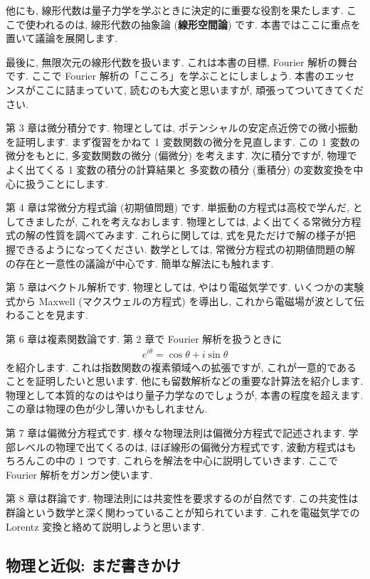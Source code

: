 \documentclass[openany, a4paper, oneside]{jsbook}
\theoremstyle{break}
\theoremstyle{breakdefn}
\begin{document}
他にも, 線形代数は量子力学を学ぶときに決定的に重要な役割を果たします.
ここで使われるのは, 線形代数の抽象論 (\textbf{線形空間論}) です.
本書ではここに重点を置いて議論を展開します.

最後に, 無限次元の線形代数を扱います.
これは本書の目標, Fourier 解析の舞台です.
ここで Fourier 解析の「こころ」を学ぶことにしましょう.
本書のエッセンスがここに詰まっていて, 読むのも大変と思いますが,
頑張ってついてきてください.

第 3 章は微分積分です.
物理としては, ポテンシャルの安定点近傍での微小振動を証明します.
まず復習をかねて 1 変数関数の微分を見直します.
この 1 変数の微分をもとに, 多変数関数の微分 (偏微分) を考えます.
次に積分ですが, 物理でよく出てくる 1 変数の積分の計算結果と
多変数の積分 (重積分) の変数変換を中心に扱うことにします.

第 4 章は常微分方程式論 (初期値問題) です.
単振動の方程式は高校で学んだ, としてきましたが, これを考えなおします.
物理としては, よく出てくる常微分方程式の解の性質を調べてみます.
これらに関しては, 式を見ただけで解の様子が把握できるようになってください.
数学としては, 常微分方程式の初期値問題の解の存在と一意性の議論が中心です.
簡単な解法にも触れます.

第 5 章はベクトル解析です.
物理としては, やはり電磁気学です.
いくつかの実験式から Maxwell (マクスウェルの方程式) を導出し,
これから電磁場が波として伝わることを見ます.

第 6 章は複素関数論です.
第 2 章で Fourier 解析を扱うときに\textbf{}
    \begin{align}
        e^{i \theta}
        =
        \cos \theta + i \sin \theta
    \end{align}
を紹介します.
これは指数関数の複素領域への拡張ですが, これが一意的であることを証明したいと思います.
他にも留数解析などの重要な計算法を紹介します.
物理として本質的なのはやはり量子力学なのでしょうが, 本書の程度を超えます.
この章は物理の色が少し薄いかもしれません.

第 7 章は偏微分方程式です.
様々な物理法則は偏微分方程式で記述されます.
学部レベルの物理で出てくるのは, ほぼ線形の偏微分方程式です,
波動方程式はもちろんこの中の 1 つです.
これらを解法を中心に説明していきます.
ここで Fourier 解析をガンガン使います.

第 8 章は群論です.
物理法則には共変性を要求するのが自然です.
この共変性は群論という数学と深く関わっていることが知られています.
これを電磁気学での Lorentz 変換と絡めて説明しようと思います.
\subsection{物理と近似: まだ書きかけ}
\end{document}
